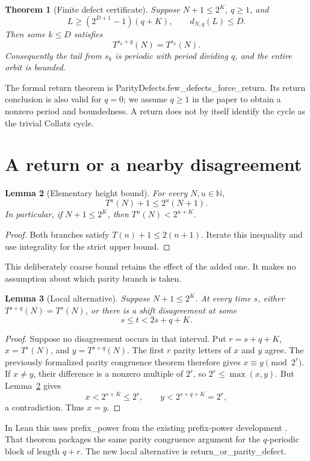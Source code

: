 \documentclass[11pt]{article}
\newtheorem{theorem}{Theorem}[section]
\newtheorem{lemma}[theorem]{Lemma}
\newcommand{\N}{\mathbb N}
\newcommand{\code}[1]{{\small\ttfamily #1}}
\begin{document}
\newpage
\begin{theorem}[Finite defect certificate]\label{thm:main}
Suppose $N+1\le2^K$, $q\ge1$, and
\begin{equation}\label{eq:threshold}
L\ge(2^{D+1}-1)(q+K),\qquad d_{N,q}(L)\le D.
\end{equation}
Then some $k\le D$ satisfies
\begin{equation}\label{eq:return}
T^{s_k+q}(N)=T^{s_k}(N).
\end{equation}
Consequently the tail from $s_k$ is periodic with period dividing $q$,
and the entire orbit is bounded.
\end{theorem}
The formal return theorem is
\code{ParityDefects.few\_\allowbreak{}defects\_\allowbreak{}force\_\allowbreak{}return}.
Its return conclusion is also valid for $q=0$; we assume $q\ge1$ in
the paper to obtain a nonzero period and boundedness. A return does not
by itself identify the cycle as the trivial Collatz cycle.

\section{A return or a nearby disagreement}
\begin{lemma}[Elementary height bound]\label{lem:height}
For every $N,u\in\N$,
\begin{equation}\label{eq:height}
T^u(N)+1\le2^u(N+1).
\end{equation}
In particular, if $N+1\le2^K$, then $T^u(N)<2^{u+K}$.
\end{lemma}
\begin{proof}
Both branches satisfy $T(n)+1\le2(n+1)$. Iterate this inequality and
use integrality for the strict upper bound.
\end{proof}
This deliberately coarse bound retains the effect of the added one.
It makes no assumption about which parity branch is taken.

\begin{lemma}[Local alternative]\label{lem:local}
Suppose $N+1\le2^K$. At every time $s$, either
$T^{s+q}(N)=T^s(N)$, or there is a shift disagreement at some
\begin{equation}\label{eq:local}
s\le t<2s+q+K.
\end{equation}
\end{lemma}
\begin{proof}
Suppose no disagreement occurs in that interval. Put $r=s+q+K$,
$x=T^s(N)$, and $y=T^{s+q}(N)$. The first $r$ parity letters of
$x$ and $y$ agree. The previously formalized parity congruence theorem
therefore gives $x\equiv y\pmod{2^r}$.
If $x\ne y$, their difference is a nonzero multiple of $2^r$, so
$2^r\le\max(x,y)$. But Lemma~\ref{lem:height} gives
\[
x<2^{s+K}\le2^r,\qquad y<2^{s+q+K}=2^r,
\]
a contradiction. Thus $x=y$.
\end{proof}
In Lean this uses \code{prefix\_\allowbreak{}power} from the existing
prefix-power development \cite{rung1}. That theorem packages the same
parity congruence argument for the $q$-periodic block of length $q+r$.
The new local alternative is \code{return\_\allowbreak{}or\_\allowbreak{}parity\_\allowbreak{}defect}.
\end{document}
